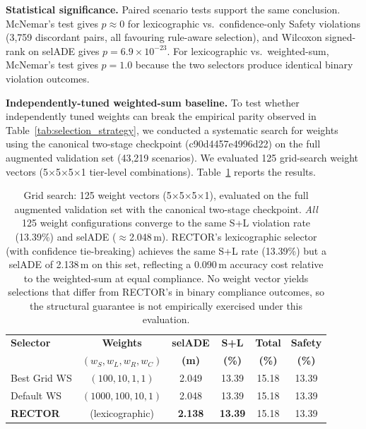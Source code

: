 \noindent\textbf{Statistical significance.}  Paired scenario tests support the same conclusion. McNemar's test gives $p \approx 0$ for lexicographic vs.\ confidence-only Safety violations (3{,}759 discordant pairs, all favouring rule-aware selection), and Wilcoxon signed-rank on selADE gives $p = 6.9 \times 10^{-23}$. For lexicographic vs.\ weighted-sum, McNemar's test gives $p = 1.0$ because the two selectors produce identical binary violation outcomes.

\noindent\textbf{Independently-tuned weighted-sum baseline.}
To test whether independently tuned weights can break the empirical parity observed in Table~\ref{tab:selection_strategy}, we conducted a systematic search for weights using the canonical two-stage checkpoint (c90d4457e4996d22) on the full augmented validation set (43{,}219 scenarios).  We evaluated 125 grid-search weight vectors (5$\times$5$\times$5$\times$1 tier-level combinations).  Table~\ref{tab:ws_independent} reports the results.

\begin{table}[t]
\centering
\caption{Independently-Tuned Weighted-Sum vs.\ RECTOR (Protocol~A, 43{,}219 scenarios, canonical checkpoint)}
\label{tab:ws_independent}
\setlength{\tabcolsep}{3pt}
\begin{tabular}{lccccc}
\toprule
\textbf{Selector} & \textbf{Weights} & \textbf{selADE} & \textbf{S+L} & \textbf{Total} & \textbf{Safety} \\
 & $(w_S, w_L, w_R, w_C)$ & \textbf{(m)} & \textbf{(\%)} & \textbf{(\%)} & \textbf{(\%)} \\
\midrule
Best Grid WS     & $(100,10,1,1)$         & 2.049 & 13.39 & 15.18 & 13.39 \\
Default WS       & $(1000,100,10,1)$      & 2.048 & 13.39 & 15.18 & 13.39 \\
\midrule
\textbf{RECTOR}  & (lexicographic)        & \textbf{2.138} & \textbf{13.39} & 15.18 & 13.39 \\
\bottomrule
\end{tabular}
\vspace{1mm}
\caption*{\footnotesize Grid search: 125 weight vectors (5$\times$5$\times$5$\times$1), evaluated on the full augmented validation set with the canonical two-stage checkpoint.  \emph{All} 125 weight configurations converge to the same S+L violation rate (13.39\%) and selADE ($\approx$2.048\,m).  RECTOR's lexicographic selector (with confidence tie-breaking) achieves the same S+L rate (13.39\%) but a selADE of 2.138\,m on this set, reflecting a 0.090\,m accuracy cost relative to the weighted-sum at equal compliance.  No weight vector yields selections that differ from RECTOR's in binary compliance outcomes, so the structural guarantee is not empirically exercised under this evaluation.}
\end{table}

